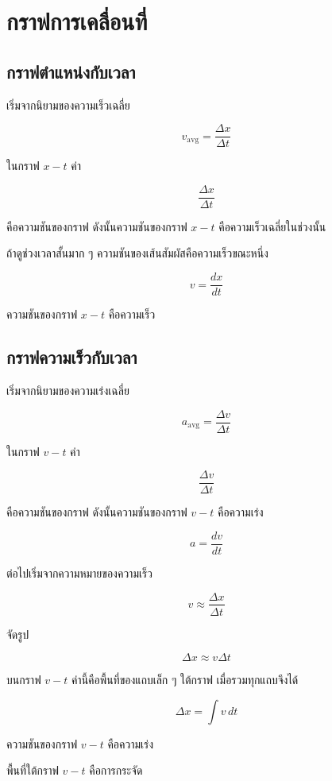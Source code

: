 \documentclass[12pt,a4paper]{report}
\begin{document}
\section{กราฟการเคลื่อนที่}

\subsection{กราฟตำแหน่งกับเวลา}

เริ่มจากนิยามของความเร็วเฉลี่ย

\[
v_{\text{avg}}=\frac{\Delta x}{\Delta t}
\]

ในกราฟ $x-t$ ค่า

\[
\frac{\Delta x}{\Delta t}
\]

คือความชันของกราฟ ดังนั้นความชันของกราฟ $x-t$ คือความเร็วเฉลี่ยในช่วงนั้น

ถ้าดูช่วงเวลาสั้นมาก ๆ ความชันของเส้นสัมผัสคือความเร็วขณะหนึ่ง

\[
v=\frac{dx}{dt}
\]

\begin{tcolorbox}[title=สรุปกราฟ $x-t$]
ความชันของกราฟ $x-t$ คือความเร็ว
\end{tcolorbox}

\subsection{กราฟความเร็วกับเวลา}

เริ่มจากนิยามของความเร่งเฉลี่ย

\[
a_{\text{avg}}=\frac{\Delta v}{\Delta t}
\]

ในกราฟ $v-t$ ค่า

\[
\frac{\Delta v}{\Delta t}
\]

คือความชันของกราฟ ดังนั้นความชันของกราฟ $v-t$ คือความเร่ง

\[
a=\frac{dv}{dt}
\]

ต่อไปเริ่มจากความหมายของความเร็ว

\[
v\approx \frac{\Delta x}{\Delta t}
\]

จัดรูป

\[
\Delta x\approx v\Delta t
\]

บนกราฟ $v-t$ ค่านี้คือพื้นที่ของแถบเล็ก ๆ ใต้กราฟ เมื่อรวมทุกแถบจึงได้

\[
\Delta x=\int v\,dt
\]

\begin{tcolorbox}[title=สรุปกราฟ $v-t$]
ความชันของกราฟ $v-t$ คือความเร่ง

พื้นที่ใต้กราฟ $v-t$ คือการกระจัด
\end{tcolorbox}
\end{document}
